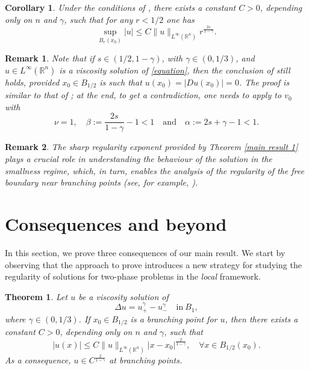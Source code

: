 \documentclass[11pt,reqno]{amsart}
\newtheorem{theorem}{Theorem}
\newtheorem{corollary}{Corollary}
\newtheorem{remark}{Remark}
\numberwithin{equation}{section}
\numberwithin{theorem}{section}
\numberwithin{lemma}{section}
\numberwithin{corollary}{section}
\numberwithin{remark}{section}
\numberwithin{proposition}{section}
\numberwithin{definition}{section}
\newcommand{\R}{\mathbb{R}}
\begin{document}
\begin{corollary}\label{c4.1}
     Under the conditions of , there exists a constant $C>0$, depending only on $n$ and $\gamma$, such that for any $r<1/2$ one has
    $$
     \sup_{B_r(x_0)}|u|\leq  C\|u\|_{L^\infty(\R^n)}r^{\frac{2s}{1-\gamma}}.
    $$   
\end{corollary}
\begin{remark}
Note that if $s\in(1/2,1-\gamma)$, with $\gamma\in(0,1/3)$, and $u\in L^\infty(\R^n)$ is a viscosity solution of \eqref{equation}, then the conclusion of  still holds, provided $x_0\in B_{1/2}$ is such that $u(x_0)=|Du(x_0)|=0$. The proof is similar to that of ; at the end, to get a contradiction, one needs to apply  to $v_0$ with
$$
\nu=1,\quad \beta:=\frac{2s}{1-\gamma}-1<1\quad \text{and}\quad \alpha:=2s+\gamma-1<1.
$$
\end{remark}

\begin{remark}
    The sharp regularity exponent provided by Theorem \ref{main result 1} plays a crucial role in understanding the behaviour of the solution in the smallness regime, which, in turn, enables the analysis of the regularity of the free boundary near branching points (see, for example, \cite{ATU24}).
\end{remark}

\medskip

\section{Consequences and beyond}\label{s5}

In this section, we prove three consequences of our main result. We start by observing that the approach to prove  introduces a new strategy for studying the regularity of solutions for two-phase problems in the \textit{local} framework. 

\begin{theorem}\label{local two-phase problem}
    Let $u$ be a viscosity solution of 
    \begin{equation}\label{local equation}
    \Delta u=u_+^\gamma-u_-^\gamma\quad \textrm{in}\ B_1,
    \end{equation}
    where $\gamma\in(0,1/3)$. If $x_0\in B_{1/2}$ is a branching point for $u$, then there exists a constant $C>0$, depending only on $n$ and $\gamma$, such that
    $$
    |u(x)|\le C\|u\|_{L^\infty(\R^n)}|x-x_0|^{\frac{2}{1-\gamma}}, \quad \forall x \in B_{1/2}(x_0).
    $$
    As a consequence, $u\in C^{\frac{2}{1-\gamma}}$ at branching points.    
\end{theorem}
\end{document}
